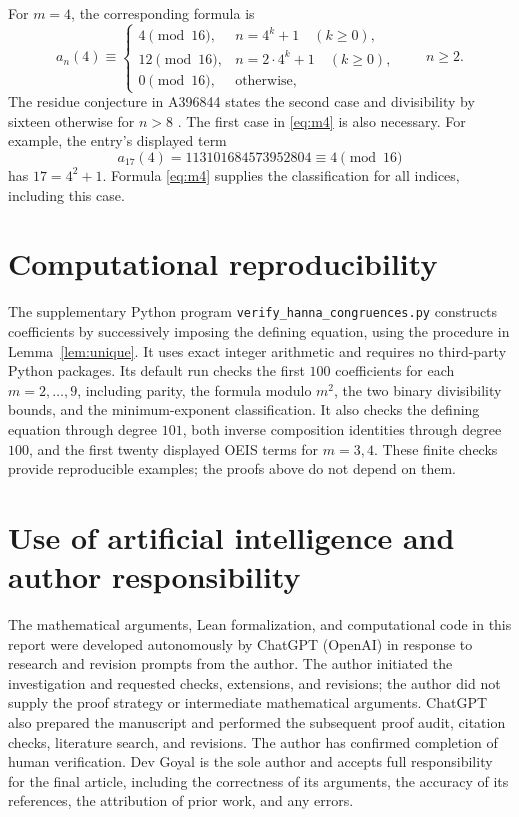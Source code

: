 \documentclass[11pt,a4paper]{article}
\theoremstyle{remark}
\begin{document}
For $m=4$, the corresponding formula is
\begin{equation}\label{eq:m4}
 a_n(4)\equiv
 \begin{cases}
 4\pmod{16},&n=4^k+1\quad(k\ge0),\\
 12\pmod{16},&n=2\cdot4^k+1\quad(k\ge0),\\
 0\pmod{16},&\text{otherwise},
 \end{cases}
 \qquad n\ge2.
\end{equation}
The residue conjecture in A396844 states the second case and divisibility
by sixteen otherwise for $n>8$ \cite{oeis4}. The first case in
\eqref{eq:m4} is also necessary. For example, the entry's displayed term
\[
 a_{17}(4)=113101684573952804\equiv4\pmod{16}
\]
has $17=4^2+1$. Formula \eqref{eq:m4} supplies the classification for all
indices, including this case.

\clearpage
\section*{Computational reproducibility}

The supplementary Python program \texttt{verify\_hanna\_congruences.py}
constructs coefficients by successively imposing the defining equation,
using the procedure in Lemma~\ref{lem:unique}. It uses exact integer
arithmetic and requires no third-party Python packages. Its default run
checks the first $100$ coefficients for each $m=2,\ldots,9$, including
parity, the formula modulo $m^2$, the two binary divisibility bounds, and
the minimum-exponent classification. It also checks the defining equation
through degree $101$, both inverse composition identities through degree
$100$, and the first twenty displayed OEIS terms for $m=3,4$.
These finite checks provide reproducible examples; the proofs above do
not depend on them.

\section*{Use of artificial intelligence and author responsibility}

The mathematical arguments, Lean formalization, and computational code in
this report
were developed autonomously by ChatGPT (OpenAI) in response to research and
revision prompts from the author. The author initiated the investigation and
requested checks, extensions, and revisions; the author did not supply the
proof strategy or intermediate mathematical arguments. ChatGPT also prepared
the manuscript and performed the subsequent proof audit, citation checks,
literature search, and revisions.
The author has confirmed completion of human verification.
Dev Goyal is the sole author and accepts full responsibility
for the final article, including the correctness of its arguments, the
accuracy of its references, the attribution of prior work, and any errors.
\end{document}

